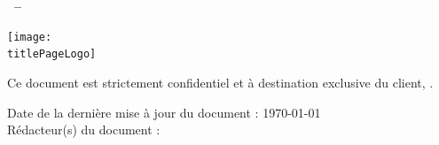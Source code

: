 \thispagestyle{empty}
\begin{center}
       \vspace*{0.15\textheight}
       \textbf{\huge {\docType~--~\client}}
       
       \vspace{0.8cm}
       \textbf{\huge \projectName}   
       
       \vspace{0.8cm}
       \texttt{[image: \\titlePageLogo]}
       \vspace{0.8cm}
       
       
       \textbf{\huge \documentName}
       \vfill
       
       
       Ce document est strictement confidentiel et à destination exclusive du client, \client .
       
       \vspace{0.8cm}
       
       
       Date de la dernière mise à jour du document : \today \\
       Rédacteur(s) du document : \redactor
            
\end{center}
\newpage
\tableofcontents
\newpage